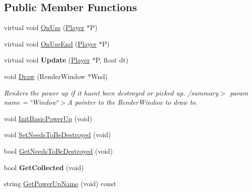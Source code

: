 \subsection*{Public Member Functions}
\begin{DoxyCompactItemize}
\item 
virtual void \hyperlink{class_engine_1_1_core_1_1_power_up_base_a1c93516694b752a8ebc42eb181cb2b78}{On\+Use} (\hyperlink{class_engine_1_1_game_play_1_1_player}{Player} $\ast$P)
\item 
virtual void \hyperlink{class_engine_1_1_core_1_1_power_up_base_a195aecea60afdb99add60661a1c95697}{On\+Use\+End} (\hyperlink{class_engine_1_1_game_play_1_1_player}{Player} $\ast$P)
\item 
\mbox{\label{class_engine_1_1_core_1_1_power_up_base_a77f94a6dcfbc04d7f3156ef23153872d}} 
virtual void {\bfseries Update} (\hyperlink{class_engine_1_1_game_play_1_1_player}{Player} $\ast$P, float dt)
\item 
void \hyperlink{class_engine_1_1_core_1_1_power_up_base_a5d145e5909ed25fb656416fe10ba7052}{Draw} (Render\+Window $\ast$Wnd)
\begin{DoxyCompactList}\small\item\em Renders the power up if it hasn\textquotesingle{}t been destroyed or picked up. /summary$>$ param name = \char`\"{}\+Window\char`\"{}$>$A pointer to the Render\+Window to draw to.\end{DoxyCompactList}\item 
void \hyperlink{class_engine_1_1_core_1_1_power_up_base_aa60b222fd4cd9be0b8fcca5e06ba4c62}{Init\+Basic\+Power\+Up} (void)
\item 
void \hyperlink{class_engine_1_1_core_1_1_power_up_base_a8f6f5112493d25a67ec0c05e65691728}{Set\+Needs\+To\+Be\+Destroyed} (void)
\item 
bool \hyperlink{class_engine_1_1_core_1_1_power_up_base_a2b54cfc2afda10849a05f3095539c682}{Get\+Needs\+To\+Be\+Destroyed} (void)
\item 
\mbox{\label{class_engine_1_1_core_1_1_power_up_base_a3a2b9ec8b5c8151afd2790bd54ce323e}} 
bool {\bfseries Get\+Collected} (void)
\item 
string \hyperlink{class_engine_1_1_core_1_1_power_up_base_a8545dee1e4beb94132acc0f03ae05a08}{Get\+Power\+Up\+Name} (void) const
\end{DoxyCompactItemize}
